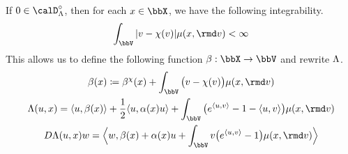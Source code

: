 \begin{lemma}
  \label{lemma:no-truncation}
  If $0 \in \odeSpace^\circ$, then for each $\stateVar \in \stateSpace$, we have the following integrability.
  \begin{equation*}
    \int_\vecSpace |\markVar - \trunc(\markVar)| \affJump(\stateVar, \rmd\markVar) < \infty
  \end{equation*}
  This allows us to define the following function $\affDrift: \stateSpace \rightarrow \vecSpace$ and rewrite $\Lambda$.
  \begin{equation}
    \label{eq:no-truncation}
    \begin{gathered}
      \affDrift(\stateVar) \defeq \affDrift^\trunc(\stateVar) + \int_\vecSpace \big(\markVar - \trunc(\markVar)\big) \affJump(\stateVar,\rmd\markVar) \\
      \ode(\momentVar, \stateVar) = \prj{\momentVar}{\affDrift(\stateVar)} + \frac12 \prj{\momentVar}{\affDiff(\stateVar)\momentVar} + \int_\vecSpace \big( e^\prj{\momentVar}{\markVar} - 1 - \prj{\momentVar}{\markVar} \big) \affJump(\stateVar, \rmd\markVar) \\
      D\ode(\momentVar,\stateVar)w = \Bprj{w}{\affDrift(\stateVar) + \affDiff(\stateVar)\momentVar + \int_\vecSpace \markVar \big( e^\prj{\momentVar}{\markVar} - 1 \big) \affJump(\stateVar,\rmd\markVar)}
    \end{gathered}
  \end{equation}
\end{lemma}
